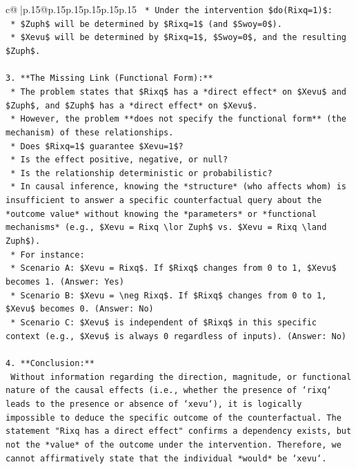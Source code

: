 \documentclass{article}
\begin{document}
{\begin{supertabular}{c@{$\;$}|p{.15\linewidth}@{}p{.15\linewidth}p{.15\linewidth}p{.15\linewidth}p{.15\linewidth}p{.15\linewidth}}
{{{\texttt{    *   Under the intervention \$do(Rixq=1)\$:} \\
\texttt{        *   \$Zuph\$ will be determined by \$Rixq=1\$ (and \$Swoy=0\$).} \\
\texttt{        *   \$Xevu\$ will be determined by \$Rixq=1\$, \$Swoy=0\$, and the resulting \$Zuph\$.} \\
\\ 
\texttt{3.  **The Missing Link (Functional Form):**} \\
\texttt{    *   The problem states that \$Rixq\$ has a *direct effect* on \$Xevu\$ and \$Zuph\$, and \$Zuph\$ has a *direct effect* on \$Xevu\$.} \\
\texttt{    *   However, the problem **does not specify the functional form** (the mechanism) of these relationships.} \\
\texttt{        *   Does \$Rixq=1\$ guarantee \$Xevu=1\$?} \\
\texttt{        *   Is the effect positive, negative, or null?} \\
\texttt{        *   Is the relationship deterministic or probabilistic?} \\
\texttt{    *   In causal inference, knowing the *structure* (who affects whom) is insufficient to answer a specific counterfactual query about the *outcome value* without knowing the *parameters* or *functional mechanisms* (e.g., \$Xevu = Rixq \textbackslash{}lor Zuph\$ vs. \$Xevu = Rixq \textbackslash{}land Zuph\$).} \\
\texttt{    *   For instance:} \\
\texttt{        *   Scenario A: \$Xevu = Rixq\$. If \$Rixq\$ changes from 0 to 1, \$Xevu\$ becomes 1. (Answer: Yes)} \\
\texttt{        *   Scenario B: \$Xevu = \textbackslash{}neg Rixq\$. If \$Rixq\$ changes from 0 to 1, \$Xevu\$ becomes 0. (Answer: No)} \\
\texttt{        *   Scenario C: \$Xevu\$ is independent of \$Rixq\$ in this specific context (e.g., \$Xevu\$ is always 0 regardless of inputs). (Answer: No)} \\
\\ 
\texttt{4.  **Conclusion:**} \\
\texttt{    Without information regarding the direction, magnitude, or functional nature of the causal effects (i.e., whether the presence of `rixq` leads to the presence or absence of `xevu`), it is logically impossible to deduce the specific outcome of the counterfactual. The statement "Rixq has a direct effect" confirms a dependency exists, but not the *value* of the outcome under the intervention. Therefore, we cannot affirmatively state that the individual *would* be `xevu`.} \\
}}}
\end{supertabular}}
\end{document}
